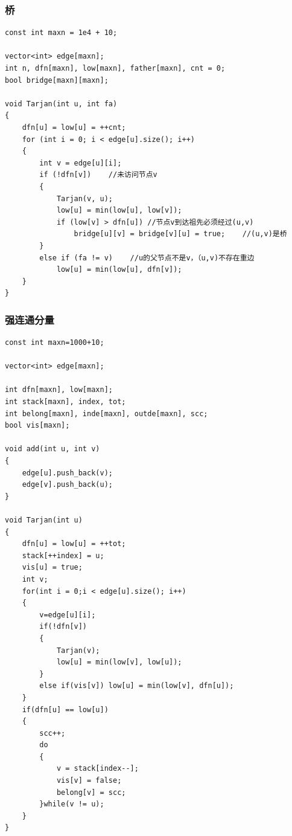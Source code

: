 \documentclass[twoside]{article}
\begin{document}
\subsubsection{桥}
\begin{lstlisting}
const int maxn = 1e4 + 10;

vector<int> edge[maxn];
int n, dfn[maxn], low[maxn], father[maxn], cnt = 0;
bool bridge[maxn][maxn];

void Tarjan(int u, int fa)
{
    dfn[u] = low[u] = ++cnt;
    for (int i = 0; i < edge[u].size(); i++)
    {
        int v = edge[u][i];
        if (!dfn[v])    //未访问节点v
        {
            Tarjan(v, u);
            low[u] = min(low[u], low[v]);
            if (low[v] > dfn[u]) //节点v到达祖先必须经过(u,v)
                bridge[u][v] = bridge[v][u] = true;    //(u,v)是桥
        } 
        else if (fa != v)    //u的父节点不是v，（u,v)不存在重边
            low[u] = min(low[u], dfn[v]);
    }
}\end{lstlisting}
\subsubsection{强连通分量}
\begin{lstlisting}
const int maxn=1000+10;

vector<int> edge[maxn];

int dfn[maxn], low[maxn];
int stack[maxn], index, tot;
int belong[maxn], inde[maxn], outde[maxn], scc;
bool vis[maxn];

void add(int u, int v)
{
	edge[u].push_back(v);
	edge[v].push_back(u);
}

void Tarjan(int u)
{
    dfn[u] = low[u] = ++tot;
    stack[++index] = u;
    vis[u] = true;
    int v;
    for(int i = 0;i < edge[u].size(); i++)
    {
        v=edge[u][i];
        if(!dfn[v])
        {
            Tarjan(v);
            low[u] = min(low[v], low[u]);
        }
        else if(vis[v]) low[u] = min(low[v], dfn[u]);
    }
    if(dfn[u] == low[u])
    {
        scc++;
        do
        {
            v = stack[index--];
            vis[v] = false;
            belong[v] = scc;
        }while(v != u);
    }
}\end{lstlisting}
\end{document}
